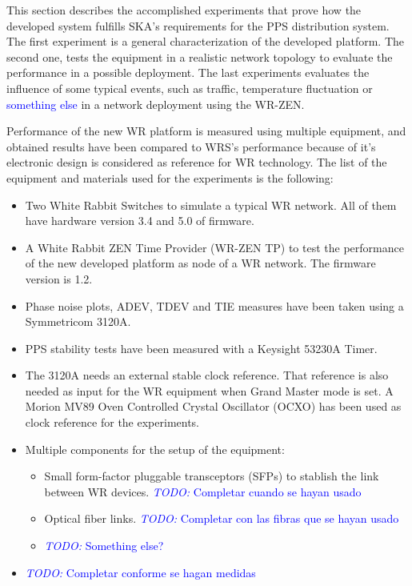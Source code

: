 
This section describes the accomplished experiments that prove how the developed system fulfills SKA's requirements for the PPS distribution system. The first experiment is a general characterization of the developed platform. The second one, tests the equipment in a realistic network topology to evaluate the performance in a possible deployment. The last experiments evaluates the influence of some typical events, such as traffic, temperature fluctuation or \textcolor{blue}{something else} in a network deployment using the WR-ZEN.

Performance of the new WR platform is measured using multiple equipment, and obtained results have been compared to WRS's performance because of it's electronic design is considered as reference for WR technology. The list of the equipment and materials used for the experiments is the following:

\begin{itemize}
    \item Two White Rabbit Switches to simulate a typical WR network. All of them have hardware version 3.4 and 5.0 of firmware.
    \item A White Rabbit ZEN Time Provider (WR-ZEN TP) to test the performance of the new developed platform as node of a WR network. The firmware version is 1.2.
    \item Phase noise plots, ADEV, TDEV and TIE measures have been taken using a Symmetricom 3120A.
    \item PPS stability tests have been measured with a Keysight 53230A Timer.
    \item The 3120A needs an external stable clock reference. That reference is also needed as input for the WR equipment when Grand Master mode is set. A Morion MV89 Oven Controlled Crystal Oscillator (OCXO) has been used as clock reference for the experiments.
    \item Multiple components for the setup of the equipment:
    \begin{itemize}
        \item Small form-factor pluggable transceptors (SFPs) to stablish the link between WR devices.  \textcolor{blue}{\textit{TODO:} Completar cuando se hayan usado}
        \item Optical fiber links. \textcolor{blue}{\textit{TODO:} Completar con las fibras que se hayan usado}
        \item \textcolor{blue}{\textit{TODO:} Something else?}
    \end{itemize}
    \item \textcolor{blue}{\textit{TODO:} Completar conforme se hagan medidas}
\end{itemize}

